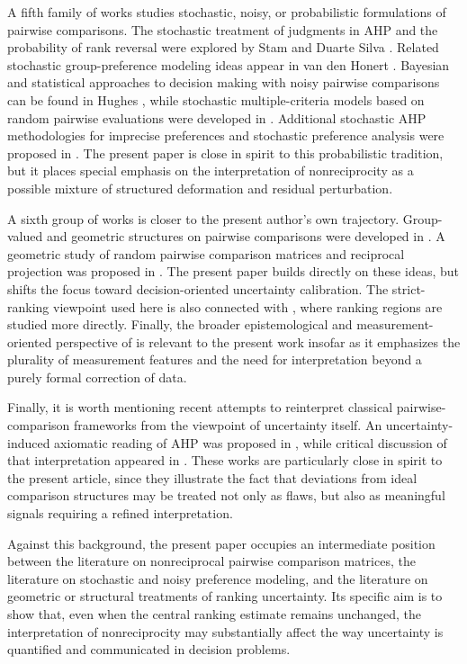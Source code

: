 \documentclass[11pt]{amsart}
\theoremstyle{definition}
\theoremstyle{plain}
\numberwithin{equation}{section}
\begin{document}
A fifth family of works studies stochastic, noisy, or probabilistic formulations of pairwise comparisons. The stochastic treatment of judgments in AHP and the probability of rank reversal were explored by Stam and Duarte Silva \cite{StamSilva1997}. Related stochastic group-preference modeling ideas appear in van den Honert \cite{VanDenHonert1998}. Bayesian and statistical approaches to decision making with noisy pairwise comparisons can be found in Hughes \cite{Hughes2009}, while stochastic multiple-criteria models based on random pairwise evaluations were developed in \cite{FanLiuFeng2010}. Additional stochastic AHP methodologies for imprecise preferences and stochastic preference analysis were proposed in \cite{JalaoWuShunk2014,DurbachEtAl2014,ZhuXu2014}. The present paper is close in spirit to this probabilistic tradition, but it places special emphasis on the interpretation of nonreciprocity as a possible mixture of structured deformation and residual perturbation.

A sixth group of works is closer to the present author's own trajectory. Group-valued and geometric structures on pairwise comparisons were developed in \cite{Magnot2019Heliyon}. A geometric study of random pairwise comparison matrices and reciprocal projection was proposed in \cite{Magnot2024JAA}. The present paper builds directly on these ideas, but shifts the focus toward decision-oriented uncertainty calibration. The strict-ranking viewpoint used here is also connected with \cite{Magnot2026AMS}, where ranking regions are studied more directly. Finally, the broader epistemological and measurement-oriented perspective of \cite{EllingsenLundholmMagnot2024} is relevant to the present work insofar as it emphasizes the plurality of measurement features and the need for interpretation beyond a purely formal correction of data.

Finally, it is worth mentioning recent attempts to reinterpret classical pairwise-comparison frameworks from the viewpoint of uncertainty itself. An uncertainty-induced axiomatic reading of AHP was proposed in \cite{LiuQiuZhang2021}, while critical discussion of that interpretation appeared in \cite{WangDeng2023}. These works are particularly close in spirit to the present article, since they illustrate the fact that deviations from ideal comparison structures may be treated not only as flaws, but also as meaningful signals requiring a refined interpretation.

Against this background, the present paper occupies an intermediate position between the literature on nonreciprocal pairwise comparison matrices, the literature on stochastic and noisy preference modeling, and the literature on geometric or structural treatments of ranking uncertainty. Its specific aim is to show that, even when the central ranking estimate remains unchanged, the interpretation of nonreciprocity may substantially affect the way uncertainty is quantified and communicated in decision problems.
\end{document}
